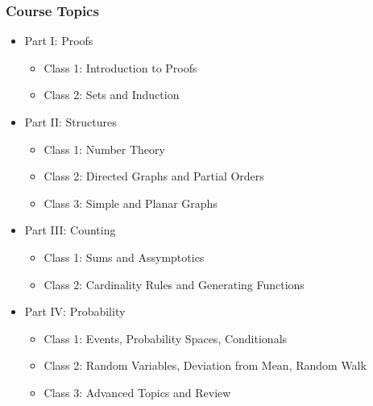 \documentclass{beamer}
\begin{document}
\begin{frame}
  \frametitle{Course Topics}
  \begin{itemize}
  \item Part I: Proofs
    \begin{itemize}
    \item Class 1: Introduction to Proofs
    \item Class 2: Sets and Induction
    \end{itemize}
  \item Part II: Structures
    \begin{itemize}
    \item Class 1: Number Theory
    \item Class 2: Directed Graphs and Partial Orders
    \item Class 3: Simple and Planar Graphs
    \end{itemize}
  \item Part III: Counting
    \begin{itemize}
    \item Class 1: Sums and Assymptotics
    \item Class 2: Cardinality Rules and Generating Functions
    \end{itemize}
  \item Part IV: Probability
    \begin{itemize}
    \item Class 1: Events, Probability Spaces, Conditionals
    \item Class 2: Random Variables, Deviation from Mean, Random Walk
    \item Class 3: Advanced Topics and Review
    \end{itemize}
  \end{itemize}
\end{frame}

%
%
%
%
\end{document}
